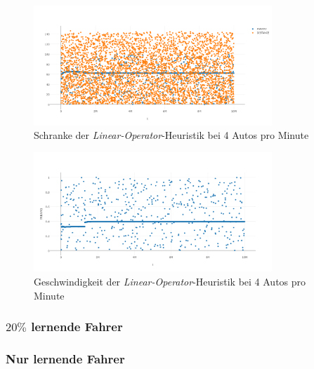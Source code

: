 \begin{figure}[H]
	\includegraphics[width=0.8\textwidth]{analyse/SingleMutant/linopzt4.png}
	\caption{Schranke der \emph{Linear-Operator}-Heuristik bei 4 Autos pro Minute}\label{fig:ap_sm_loz_4}
\end{figure}
\begin{figure}[H]
	\includegraphics[width=0.8\textwidth]{analyse/SingleMutant/linopa4.png}
	\caption{Geschwindigkeit der \emph{Linear-Operator}-Heuristik bei 4 Autos pro Minute}\label{fig:ap_sm_loa_4}
\end{figure}



\subsubsection*{$20\%$ lernende Fahrer}



\subsubsection*{Nur lernende Fahrer}